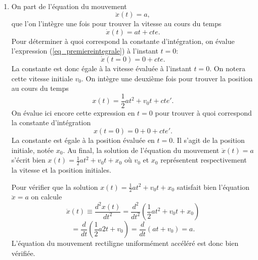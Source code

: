 %
%
\\[-3mm]
\begin{enumerate}
\item

On part de l'\'equation du mouvement
\[
\ddot{x}(t) =  a,
\] 
que l'on l'int\`egre une fois pour trouver la vitesse au cours du temps
\begin{equation}
\dot{x}(t) = at + cte.
\label{eq_premiereintegrale}
\end{equation}
Pour d\'eterminer \`a quoi correspond la constante d'int\'egration, on \'evalue l'expression (\ref{eq_premiereintegrale}) \`a l'instant $t=0$:
\[
\dot{x}(t=0) = 0 + cte. 
\]
La constante est donc \'egale \`a la vitesse \'evalu\'ee \`a l'instant $t=0$. On notera cette vitesse initiale $v_0$. 
On int\`egre une deuxi\`eme fois pour trouver la position au cours du temps
\begin{equation}
x(t) = \frac{1}{2}at^2 + v_0 t + cte'.
\label{eq_deuxiemeintegrale}
\end{equation}
On \'evalue ici encore cette expression en $t=0$ pour trouver \`a quoi correspond la constante d'int\'egration
\[
x(t=0) = 0 + 0 + cte'.
\]
La constante est \'egale \`a la position \'evalu\'ee en $t=0$. Il s'agit de la position initiale, not\'ee $x_0$.
Au final, la solution de l'\'equation du mouvement $\ddot{x}(t) =  a$ s'\'ecrit bien $x(t) = \frac{1}{2}at^2 + v_0 t + x_0$ o\`u $v_0$ et $x_0$ repr\'esentent respectivement la vitesse et la position initiales.

Pour v\'erifier que la solution $x(t)=\frac{1}{2}at^2+v_0t+x_0$ satisfait bien l'\'equation $\ddot{x}=a$ on calcule
\[
\ddot{x}(t) \equiv \frac{d^2x(t)}{dt^2} = \frac{d^2}{dt^2}\left(\frac{1}{2}at^2+v_0t+x_0\right)
\]
\[
= \frac{d}{dt}\left(\frac{1}{2}a2t+v_0\right) = \frac{d}{dt}\left(at+v_0\right) = a.  
\]
L'\'equation du mouvement rectiligne uniform\'ement acc\'el\'er\'e est donc bien v\'erifi\'ee.


\end{enumerate}
